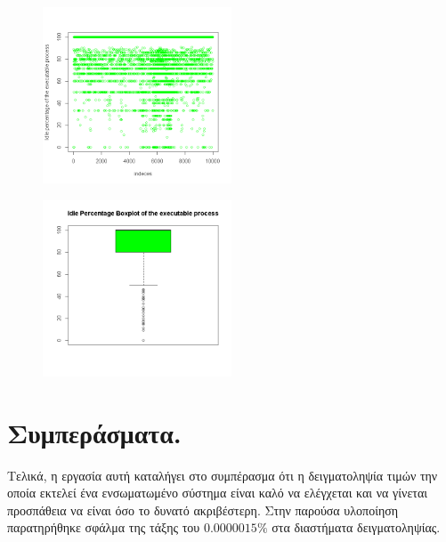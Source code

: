\documentclass[12pt, a4paper]{article}
\begin{document}
\begin{figure}[H]
    \caption{}
    \centering
    \includegraphics[width=0.5\textwidth]{images/idle.png}
\end{figure}


\begin{figure}[H]
    \caption{}
    \centering
    \includegraphics[width=0.5\textwidth]{images/idle_boxpplot.png}
\end{figure}


\section{Συμπεράσματα.}
Τελικά, η εργασία αυτή καταλήγει στο συμπέρασμα ότι η δειγματοληψία τιμών την οποία εκτελεί ένα ενσωματωμένο σύστημα είναι καλό να ελέγχεται και να γίνεται προσπάθεια να είναι όσο το δυνατό ακριβέστερη. Στην παρούσα υλοποίηση παρατηρήθηκε σφάλμα της τάξης του $0.0000015\%$ στα διαστήματα δειγματοληψίας.


\end{document}
